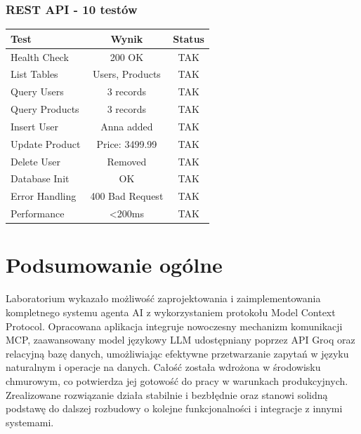 \documentclass[twoside]{article}
\begin{document}
\subsubsection{REST API - 10 testów}

\begin{table}[H]
	\centering
	\begin{tabular}{|l|c|c|}
		\hline
		\textbf{Test} & \textbf{Wynik} & \textbf{Status} \\
		\hline
		Health Check & 200 OK & TAK \\
		\hline
		List Tables & Users, Products & TAK \\
		\hline
		Query Users & 3 records & TAK \\
		\hline
		Query Products & 3 records & TAK \\
		\hline
		Insert User & Anna added & TAK \\
		\hline
		Update Product & Price: 3499.99 & TAK \\
		\hline
		Delete User & Removed & TAK \\
		\hline
		Database Init & OK & TAK \\
		\hline
		Error Handling & 400 Bad Request & TAK \\
		\hline
		Performance & <200ms & TAK \\
		\hline
	\end{tabular}
\end{table}

\section{Podsumowanie ogólne}

Laboratorium wykazało możliwość zaprojektowania i zaimplementowania kompletnego systemu agenta AI z wykorzystaniem protokołu Model Context Protocol. Opracowana aplikacja integruje nowoczesny mechanizm komunikacji MCP, zaawansowany model językowy LLM udostępniany poprzez API Groq oraz relacyjną bazę danych, umożliwiając efektywne przetwarzanie zapytań w języku naturalnym i operacje na danych. Całość została wdrożona w środowisku chmurowym, co potwierdza jej gotowość do pracy w warunkach produkcyjnych. Zrealizowane rozwiązanie działa stabilnie i bezbłędnie oraz stanowi solidną podstawę do dalszej rozbudowy o kolejne funkcjonalności i integracje z innymi systemami.
\end{document}
